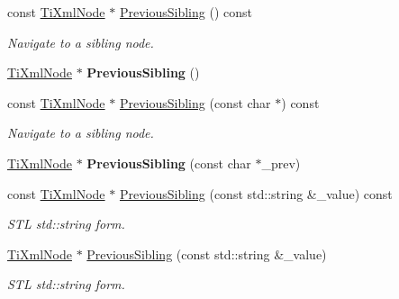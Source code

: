 \begin{DoxyCompactItemize}
const \hyperlink{class_ti_xml_node}{Ti\+Xml\+Node} $\ast$ \hyperlink{class_ti_xml_node_a8aacf06b1a577ff0d7cfa502cc76da32}{Previous\+Sibling} () const
\begin{DoxyCompactList}\small\item\em Navigate to a sibling node. \end{DoxyCompactList}\item 
\mbox{\label{class_ti_xml_node_af8c0642ad6ecc03f62953e68896ed1cc}} 
\hyperlink{class_ti_xml_node}{Ti\+Xml\+Node} $\ast$ {\bfseries Previous\+Sibling} ()
\item 
\mbox{\label{class_ti_xml_node_ace1b618fe58b2b9305fe89bfbc8dd17b}} 
const \hyperlink{class_ti_xml_node}{Ti\+Xml\+Node} $\ast$ \hyperlink{class_ti_xml_node_ace1b618fe58b2b9305fe89bfbc8dd17b}{Previous\+Sibling} (const char $\ast$) const
\begin{DoxyCompactList}\small\item\em Navigate to a sibling node. \end{DoxyCompactList}\item 
\mbox{\label{class_ti_xml_node_a6c977049207177ef21b51972315c2053}} 
\hyperlink{class_ti_xml_node}{Ti\+Xml\+Node} $\ast$ {\bfseries Previous\+Sibling} (const char $\ast$\+\_\+prev)
\item 
\mbox{\label{class_ti_xml_node_a64ee1c722b607040cd02bd0fd05eb04a}} 
const \hyperlink{class_ti_xml_node}{Ti\+Xml\+Node} $\ast$ \hyperlink{class_ti_xml_node_a64ee1c722b607040cd02bd0fd05eb04a}{Previous\+Sibling} (const std\+::string \&\+\_\+value) const
\begin{DoxyCompactList}\small\item\em S\+TL std\+::string form. \end{DoxyCompactList}\item 
\mbox{\label{class_ti_xml_node_acc8a0434c7f401d4a3b6dee77c1a5912}} 
\hyperlink{class_ti_xml_node}{Ti\+Xml\+Node} $\ast$ \hyperlink{class_ti_xml_node_acc8a0434c7f401d4a3b6dee77c1a5912}{Previous\+Sibling} (const std\+::string \&\+\_\+value)
\begin{DoxyCompactList}\small\item\em S\+TL std\+::string form. \end{DoxyCompactList}\item 

\end{DoxyCompactItemize}
